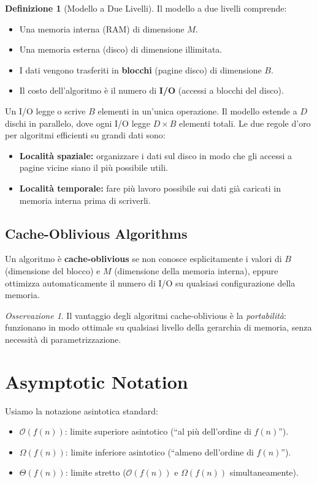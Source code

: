 \documentclass[12pt, a4paper, oneside]{book}
\theoremstyle{plain}
\theoremstyle{definition}
\newtheorem{definizione}[teorema]{Definizione}
\theoremstyle{remark}
\newtheorem{osservazione}[teorema]{Osservazione}
\newcommand{\OO}[1]{\mathcal{O}\!\left(#1\right)}
\newcommand{\Om}[1]{\Omega\!\left(#1\right)}
\newcommand{\Th}[1]{\Theta\!\left(#1\right)}
\begin{document}
\begin{definizione}[Modello a Due Livelli]
Il modello a due livelli comprende:
\begin{itemize}
  \item Una memoria interna (RAM) di dimensione $M$.
  \item Una memoria esterna (disco) di dimensione illimitata.
  \item I dati vengono trasferiti in \textbf{blocchi} (pagine disco) di dimensione $B$.
  \item Il costo dell'algoritmo è il numero di \textbf{I/O} (accessi a blocchi del disco).
\end{itemize}
\end{definizione}

Un I/O legge o scrive $B$ elementi in un'unica operazione. Il modello estende a $D$ dischi in parallelo, dove ogni I/O legge $D \times B$ elementi totali. Le due regole d'oro per algoritmi efficienti su grandi dati sono:
\begin{itemize}
  \item \textbf{Località spaziale:} organizzare i dati sul disco in modo che gli accessi a pagine vicine siano il più possibile utili.
  \item \textbf{Località temporale:} fare più lavoro possibile sui dati già caricati in memoria interna prima di scriverli.
\end{itemize}

\subsection{Cache-Oblivious Algorithms}

Un algoritmo è \textbf{cache-oblivious} se non conosce esplicitamente i valori di $B$ (dimensione del blocco) e $M$ (dimensione della memoria interna), eppure ottimizza automaticamente il numero di I/O su qualsiasi configurazione della memoria.

\begin{osservazione}
Il vantaggio degli algoritmi cache-oblivious è la \emph{portabilità}: funzionano in modo ottimale su qualsiasi livello della gerarchia di memoria, senza necessità di parametrizzazione.
\end{osservazione}

\section{Asymptotic Notation}

Usiamo la notazione asintotica standard:
\begin{itemize}
  \item $\OO{f(n)}$: limite superiore asintotico (``al più dell'ordine di $f(n)$'').
  \item $\Om{f(n)}$: limite inferiore asintotico (``almeno dell'ordine di $f(n)$'').
  \item $\Th{f(n)}$: limite stretto ($\OO{f(n)}$ e $\Om{f(n)}$ simultaneamente).
\end{itemize}
\end{document}
